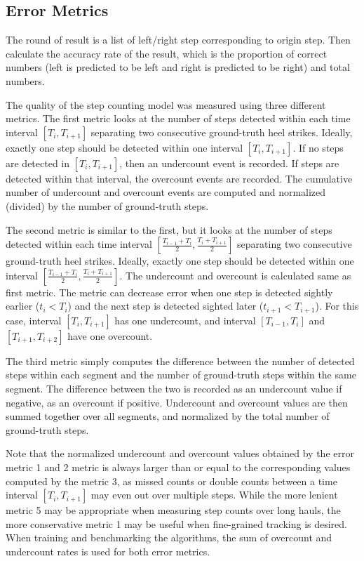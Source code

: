 \documentclass[11pt]{article}
\begin{document}
\subsection{Error Metrics}
The round of result is a list of left/right step corresponding to origin step. Then calculate the accuracy rate of the result, which is the proportion of correct numbers (left is predicted to be left and right is predicted to be right) and total numbers.


The quality of the step counting model was measured using three different metrics. The first metric looks at the number of steps detected within each time interval $[T_i, T_{i+1}]$ separating two consecutive ground-truth heel strikes. Ideally, exactly one step should be detected within one interval $[T_i, T_{i+1}]$. If no steps are detected in $[T_i, T_{i+1}]$, then an undercount event is recorded. If steps are detected within that interval, the overcount events are recorded. The cumulative number of undercount and overcount events are computed and normalized (divided) by the number of ground-truth steps.

The second metric is similar to the first,  but it looks at the number of steps detected within each time interval $[\frac{T_{i-1}+T_i}{2}, \frac{T_i+T_{i+1}}{2}]$ separating two consecutive ground-truth heel strikes. Ideally, exactly one step should be detected within one interval $[\frac{T_{i-1}+T_i}{2}, \frac{T_i+T_{i+1}}{2}]$. The undercount and overcount is calculated same as first metric. The metric can decrease error when one step is detected sightly earlier ($t_i<T_i$) and the next step is detected sighted later ($t_{i+1}<T_{i+1}$). For this case, interval $[T_i, T_{i+1}]$ has one undercount, and interval $[T_{i-1}, T_i]$ and $[T_{i+1}, T_{i+2}]$ have one overcount.

The third metric simply computes the difference between the number of detected steps within each segment and the number of ground-truth steps within the same segment. The difference between the two is recorded as an undercount value if negative, as an overcount if positive. Undercount and overcount values are then summed together over all segments, and normalized by the total number of ground-truth steps.

Note that the normalized undercount and overcount values obtained by the error metric 1 and 2 metric is always larger than or equal to the corresponding values computed by the metric 3, as missed counts or double counts between a time interval $[T_i, T_{i+1}]$ may even out over multiple steps. While the more lenient metric 5 may be appropriate when measuring step counts over long hauls, the more conservative metric 1 may be useful when fine-grained tracking is desired. When training and benchmarking the algorithms, the sum of overcount and undercount rates is used for both error metrics.
\end{document}
